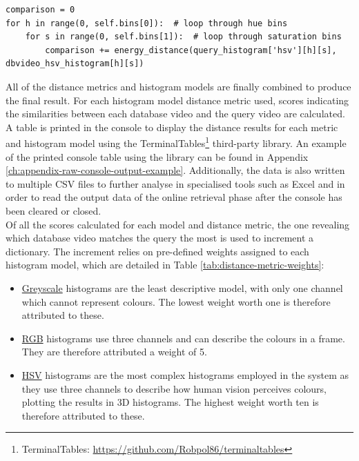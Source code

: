 \begin{enumerate}
\begin{verbatim}
comparison = 0
for h in range(0, self.bins[0]):  # loop through hue bins
    for s in range(0, self.bins[1]):  # loop through saturation bins
        comparison += energy_distance(query_histogram['hsv'][h][s], dbvideo_hsv_histogram[h][s])
\end{verbatim}
    
\end{enumerate}

All of the distance metrics and histogram models are finally combined to produce the final result. For each histogram model distance metric used, scores indicating the similarities between each database video and the query video are calculated. A table is printed in the console to display the distance results for each metric and histogram model using the TerminalTables\footnote{TerminalTables: \url{https://github.com/Robpol86/terminaltables}} third-party library. An example of the printed console table using the library can be found in Appendix \ref{ch:appendix-raw-console-output-example}. Additionally, the data is also written to multiple CSV files to further analyse in specialised tools such as Excel and in order to read the output data of the online retrieval phase after the console has been cleared or closed.\\

Of all the scores calculated for each model and distance metric, the one revealing which database video matches the query the most is used to increment a dictionary. The increment relies on pre-defined weights assigned to each histogram model, which are detailed in Table \ref{tab:distance-metric-weights}:

\begin{itemize}
    \item \underline{Greyscale} histograms are the least descriptive model, with only one channel which cannot represent colours. The lowest weight worth one is therefore attributed to these.
    \item \underline{RGB} histograms use three channels and can describe the colours in a frame. They are therefore attributed a weight of 5.
    \item \underline{HSV} histograms are the most complex histograms employed in the system as they use three channels to describe how human vision perceives colours, plotting the results in 3D histograms. The highest weight worth ten is therefore attributed to these.
\end{itemize}

